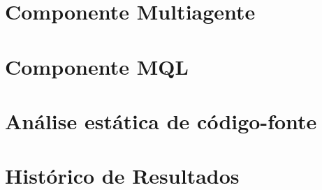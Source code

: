 \begin{apendicesenv}
\chapter{Componente Multiagente}
\label{ap:sma}


\chapter{Componente MQL}
\label{ap:mql}


\chapter{Análise estática de código-fonte}
\label{ap:analise}


\chapter{Histórico de Resultados}
\label{ap:historico}

\end{apendicesenv}

